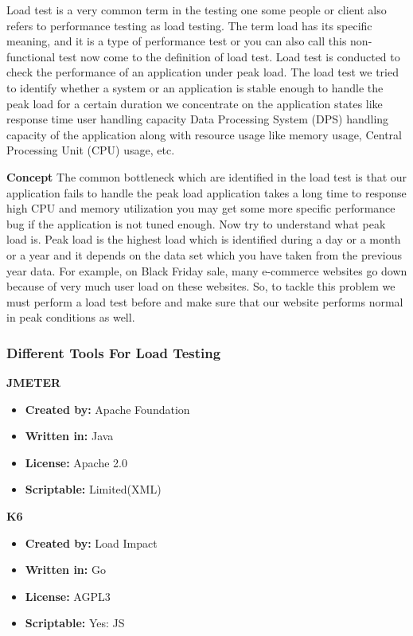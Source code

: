 Load test is a very common term in the testing one some people or client also refers to performance testing as load testing. The term load has its specific meaning, and it is a type of performance test or you can also call this non-functional test now come to the definition of load test. Load test is conducted to check the performance of an application under peak load. The load test we tried to identify whether a system or an application is stable enough to handle the peak load for a certain duration we concentrate on the application states like response time user handling capacity Data Processing System (DPS) handling capacity of the application along with resource usage like memory usage, Central Processing Unit (CPU) usage, etc.


\textbf{Concept}
The common bottleneck which are identified in the load test is that our application fails to handle the peak load application takes a long time to response high CPU and memory utilization you may get some more specific performance bug if the application is not tuned enough. Now try to understand what peak load is. Peak load is the highest load which is identified during a day or a month or a year and it depends on the data set which you have taken from the previous year data. For example, on Black Friday sale, many e-commerce websites go down because of very much user load on these websites. So, to tackle this problem we must perform a load test before and make sure that our website performs normal in peak conditions as well.


\subsubsection{Different Tools For Load Testing}

\textbf{JMETER}
\begin{itemize}
\item \textbf{Created by:} Apache Foundation
\item \textbf{Written in:} Java
\item \textbf{License:} Apache 2.0
\item \textbf{Scriptable:} Limited(XML)
\end{itemize}
\textbf{K6}
\begin{itemize}
\item \textbf{Created by:} Load Impact
\item \textbf{Written in:} Go
\item \textbf{License:} AGPL3
\item \textbf{Scriptable:} Yes: JS

\end{itemize}






